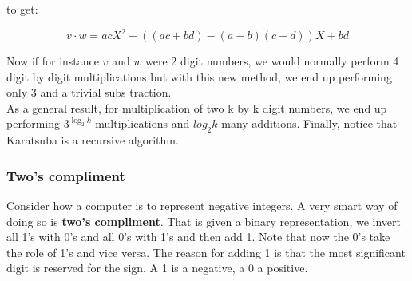 \documentclass{article}
\theoremstyle{definition}
\begin{document}
to get:

\begin{equation*}
    v\cdot w = acX^2 + ((ac + bd) - (a - b)(c - d))X + bd
\end{equation*}

Now if for instance $v$ and $w$ were 2 digit numbers, we would normally perform 4 digit by digit multiplications but with this new method, we end up performing only 3 and a trivial subs traction. 
\\
As a general result, for multiplication of two k by k digit numbers, we end up performing $3^{\log_{2}k}$ multiplications and $log_{2}k$ many additions. Finally, notice that Karatsuba is a recursive algorithm. 
\subsubsection{Two's compliment}
Consider how a computer is to represent negative integers. A very smart way of doing so is \textbf{two's compliment}. That is given a binary representation, we invert all 1's with 0's and all 0's with 1's and then add 1. Note that now the 0's take the role of 1's and vice versa. The reason for adding 1 is that the most significant digit is reserved for the sign. A 1 is a negative, a 0 a positive.  
\end{document}
